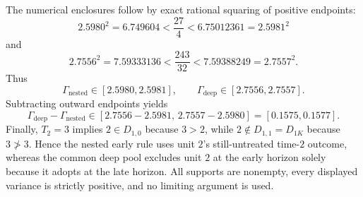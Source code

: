 The numerical enclosures follow by exact rational squaring of positive
endpoints:
\[
 2.5980^2=6.749604<\frac{27}{4}<6.75012361=2.5981^2
\]
and
\[
 2.7556^2=7.59333136<\frac{243}{32}<7.59388249=2.7557^2.
\]
Thus
\[
 \Gamma_{\mathrm{nested}}\in[2.5980,2.5981],
 \qquad
 \Gamma_{\mathrm{deep}}\in[2.7556,2.7557].
\]
Subtracting outward endpoints yields
\[
 \Gamma_{\mathrm{deep}}-\Gamma_{\mathrm{nested}}
 \in[2.7556-2.5981,\,2.7557-2.5980]
 =[0.1575,0.1577]. \tag{20}
\]
Finally, \(T_2=3\) implies \(2\in D_{1,0}\) because \(3>2\), while
\(2\notin D_{1,1}=D_{1K}\) because \(3\not>3\).  Hence the nested early rule
uses unit \(2\)'s still-untreated time-\(2\) outcome, whereas the common deep
pool excludes unit \(2\) at the early horizon solely because it adopts at the
late horizon.  All supports are nonempty, every displayed variance is
strictly positive, and no limiting argument is used.
